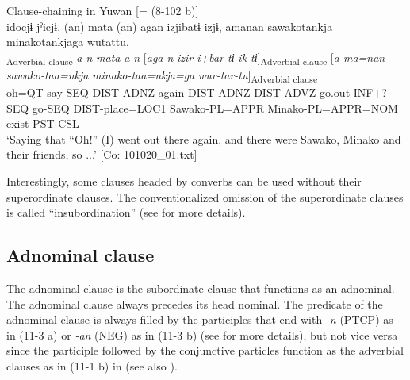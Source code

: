 \ea\label{ex:11-2}  Clause-chaining in Yuwan [= (8-102 b)]\\
    \glll idocjɨ  jˀicjɨ,  (an)  mata  (an)  agan izjibatɨ  izjɨ,  amanan  sawakotankja minakotankjaga  wutattu,\\
    [\textit{ido=ccjɨ}  \textit{jˀ-tɨ}]\textsubscript{Adverbial clause}  \textit{a-n}  \textit{mata}  \textit{a-n}  [\textit{aga-n} \textit{izir-i+bar-tɨ}  \textit{ik-tɨ}]\textsubscript{Adverbial clause}\textbf{  }[\textit{a-ma=nan}  \textit{sawako-taa=nkja}  \textit{minako-taa=nkja=ga}  \textit{wur-tar-tu}]\textsubscript{Adverbial clause}\\
    oh=QT  say-SEQ  DIST-ADNZ  again  DIST-ADNZ  DIST-ADVZ go.out-INF+?-SEQ  go-SEQ  DIST-place=LOC1  Sawako-PL=APPR Minako-PL=APPR=NOM  exist-PST-CSL\\
    \glt ‘Saying that “Oh!” (I) went out there again, and there were Sawako, Minako and their friends, so ...’ [Co: 101020\_01.txt]
\z

Interestingly, some clauses headed by converbs can be used without their superordinate clauses. The conventionalized omission of the superordinate clauses is called “insubordination” (see  for more details).

\subsection{Adnominal clause}\label{sec:11.1.2}

The adnominal clause is the subordinate clause that functions as an adnominal. The adnominal clause always precedes its head nominal. The predicate of the adnominal clause is always filled by the participles that end with \textit{{}-n} (PTCP) as in (11-3 a) or \textit{{}-an} (NEG) as in (11-3 b) (see  for more details), but not vice versa since the participle followed by the conjunctive particles function as the adverbial clauses as in (11-1 b) in  (see also ).

